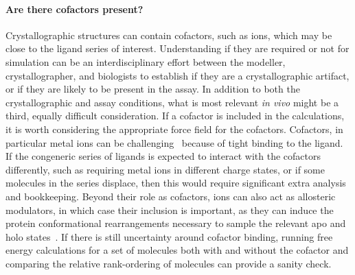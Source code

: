 \documentclass[9pt,bestpractices]{livecoms}
\begin{document}
\paragraph{Are there cofactors present?}
Crystallographic structures can contain cofactors, such as ions, which may be close to the ligand series of interest. Understanding if they are required or not for simulation can be an interdisciplinary effort between the modeller, crystallographer, and biologists to establish if they are a crystallographic artifact, or if they are likely to be present in the assay. In addition to both the crystallographic and assay conditions, what is most relevant \textit{in vivo} might be a third, equally difficult consideration. If a cofactor is included in the calculations, it is worth considering the appropriate force field for the cofactors. Cofactors, in particular metal ions can be challenging~\cite{mobley2017predicting, guven2024protocols} because of tight binding to the ligand.  If the congeneric series of ligands is expected to interact with the cofactors differently, such as requiring metal ions in different charge states, or if some molecules in the series displace, then this would require significant extra analysis and bookkeeping. Beyond their role as cofactors, ions can also act as allosteric modulators, in which case their inclusion is important, as they can induce the protein conformational rearrangements necessary to sample the relevant apo and holo states~\cite{NithishABFE}. If there is still uncertainty around cofactor binding, running free energy calculations for a set of molecules both with and without the cofactor and comparing the relative rank-ordering of molecules can provide a sanity check.
\end{document}
